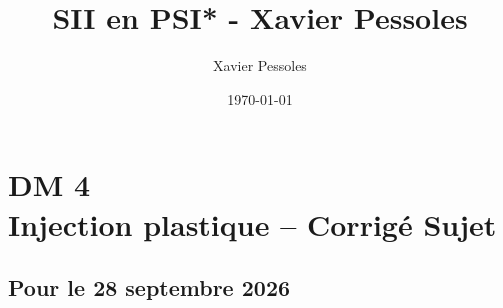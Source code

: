 \documentclass[
	fontsize=10pt, %
	twoside=true, %
]{kaobook}
\newcommand{\repRel}{../../../..}
\newcommand{\repStyle}{\repRel/Style}
\begin{document}

\titlehead{Document Template}
\title[SII en PSI* - Xavier Pessoles]{SII en PSI* - Xavier Pessoles}
\author[XP]{Xavier Pessoles}
\date{\today}

%
\frontmatter %


%
\mainmatter %


\setcounter{margintocdepth}{\sectiontocdepth}
\marginlayout
\graphicspath{{\repStyle/png}}

\pagestyle{xp.scrheadings}



\newcommand{\repExo}{}
\newcommand{\nomExo}{}

\livretfalse %
\collefalse\colletrue
\normaltrue

\newcommand{\exer}{\subsection*}

\chapter*{DM 4 \\ 
Injection plastique -- 
\ifprof Corrigé \else Sujet \fi}


\renewcommand{\repExo}{\repRel/Sujets_Concours/2026/ATS/}
\renewcommand{\nomExo}{2026_ats_p3}


\section*{Pour le 28 septembre 2026}

\graphicspath{{\repRel/Style/png/}{\repExo/images/}}

\end{document}

